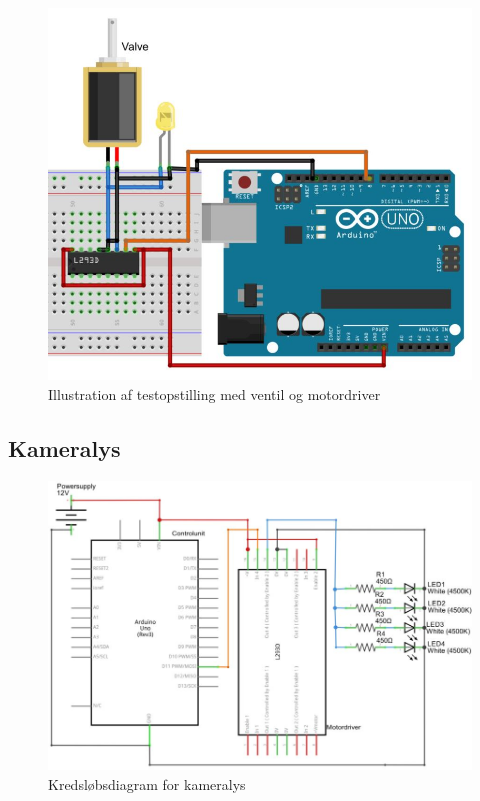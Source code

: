 \begin{figure}[H]
	\centering
	\includegraphics[width=1\textwidth]{billeder/Hardware/diagrammer/Ventilbreadboard.JPG}
	\caption{Illustration af testopstilling med ventil og motordriver}
	\label{fig:ventilbreadboard}
\end{figure} 

 \subsection{Kameralys}
 
 \begin{figure}[H]
	\centering
	\includegraphics[width=1\textwidth]{billeder/Hardware/diagrammer/LEDdiagram.JPG}
	\caption{Kredsløbsdiagram for kameralys}
	\label{fig:LEDdiagram}
\end{figure} 

